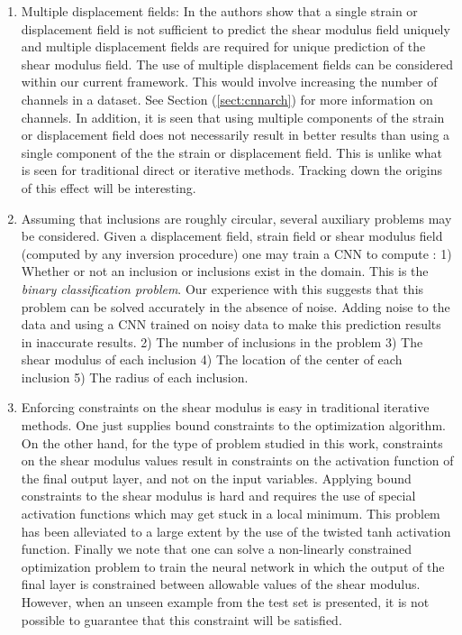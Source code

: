 \documentclass[12pt]{article}
\begin{document}
\begin{enumerate}
\item{Multiple displacement fields: In \cite{paper:barbonegokhale,paper:barbonebamber} the authors show that a single strain or displacement field is not sufficient to predict the shear modulus field uniquely and multiple displacement fields are required for unique prediction of the shear modulus field. The use of multiple displacement fields can be considered within our current framework. This would involve increasing the number of channels in a dataset. See Section (\ref{sect:cnnarch}) for more information on channels. In addition, it is seen that using multiple components of the strain or displacement field does not necessarily result in better results than using a single component of the the strain or displacement field. This is unlike what is seen for traditional direct or iterative methods. Tracking down the origins of this effect will be interesting.} 
\item{Assuming that inclusions are roughly circular, several auxiliary problems may be considered. Given a displacement field, strain field or shear modulus field (computed by any inversion procedure) one may train a CNN to compute : 1) Whether or not an inclusion or inclusions exist  in the domain. This is the \textit{binary classification problem}. Our experience with this suggests that this problem can be solved accurately in the absence of noise.  Adding noise to the data and using a CNN trained on noisy data to make this prediction results in inaccurate results. 2) The number of inclusions in the problem 3) The shear modulus of each inclusion 4) The location of the center of each inclusion 5) The radius of each inclusion.}
\item{Enforcing constraints on the shear modulus is easy in traditional iterative methods. One just supplies bound constraints to the optimization algorithm. On the other hand, for the type of problem studied in this work, constraints on the shear modulus values result in constraints on the activation function of the final output layer, and not on the input variables. Applying bound constraints to the shear modulus is hard and requires the use of special activation functions which may get stuck in a local minimum. This problem has been alleviated to a large extent by the use of the twisted tanh activation function. Finally we note that one can solve a non-linearly constrained optimization problem to train the neural network in which the output of the final layer is constrained between allowable values of the shear modulus. However, when an unseen example from the test set is presented, it is not possible to guarantee that this constraint will be satisfied.}

\end{enumerate}
\end{document}

